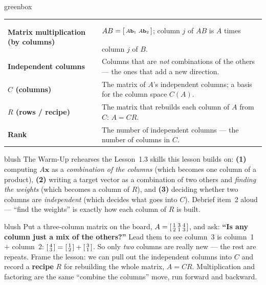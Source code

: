 \documentclass[10pt]{article}
\newcommand{\TallMath}[1]{$\displaystyle #1\rule[-1.4em]{0pt}{3.2em}$}
\newcommand{\xx}{\mathbf{x}}
\newcommand{\bb}{\mathbf{b}}
\begin{document}
\begin{skillbox}{greenbox}
\renewcommand{\arraystretch}{1.3}
\begin{tabularx}{\linewidth}{@{}l X@{}}
\textbf{Matrix multiplication (by columns)} & \TallMath{AB=\begin{bsmallmatrix} A\bb_1 & A\bb_2 \end{bsmallmatrix}}; column $j$ of $AB$ is $A$ times column $j$ of $B$. \\
\textbf{Independent columns} & Columns that are \emph{not} combinations of the others --- the ones that add a new direction. \\
\textbf{$C$ (columns)} & The matrix of $A$'s independent columns; a basis for the column space $C(A)$. \\
\textbf{$R$ (rows / recipe)} & The matrix that rebuilds each column of $A$ from $C$: $A=CR$. \\
\textbf{Rank} & The number of independent columns --- the number of columns in $C$. \\
\end{tabularx}
\end{skillbox}

\begin{fixedskillbox}{blush}
    The Warm-Up rehearses the Lesson~1.3 skills this lesson builds on:
    \textbf{(1)} computing $A\xx$ as a \emph{combination of the columns} (which becomes one column
    of a product), \textbf{(2)} writing a target vector as a combination of two others and
    \emph{finding the weights} (which becomes a column of $R$), and \textbf{(3)} deciding whether
    two columns are \emph{independent} (which decides what goes into $C$). Debrief item~2 aloud ---
    ``find the weights'' is exactly how each column of $R$ is built.
\end{fixedskillbox}

\begin{skillbox}[Hook]{blush}
    Put a three-column matrix on the board,
    $A=\begin{bsmallmatrix} 1 & 3 & 4 \\ 2 & 1 & 3 \end{bsmallmatrix}$, and ask:
    \textbf{``Is any column just a mix of the others?''} Lead them to see column~3 is
    column~1 $+$ column~2: $\begin{bsmallmatrix} 4\\3 \end{bsmallmatrix}=\begin{bsmallmatrix} 1\\2 \end{bsmallmatrix}+\begin{bsmallmatrix} 3\\1 \end{bsmallmatrix}$.
    So only \emph{two} columns are really new --- the rest are repeats. Frame the lesson: we can
    pull out the independent columns into $C$ and record a \textbf{recipe} $R$ for rebuilding the
    whole matrix, $A=CR$. Multiplication and factoring are the same ``combine the columns'' move,
    run forward and backward.
\end{skillbox}
\end{document}
